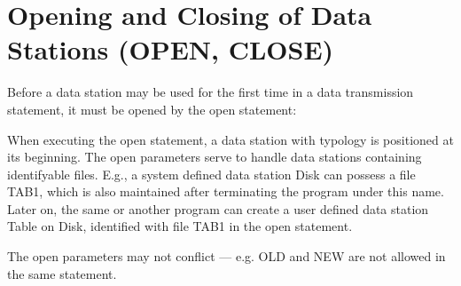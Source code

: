 \section{Opening and Closing of Data Stations (OPEN, CLOSE)}   %
\label{sec_open_close}

Before a data station may be used for the first time in a data
transmission statement, it must be opened by the open statement:



When executing the open statement, a data station with typology is
positioned at its beginning.
The open parameters serve to handle data stations containing
identifyable files. E.g., a system defined data station Disk can possess
a file TAB1, which is also maintained after terminating the program
under this name. Later on, the same or another program can create a user
defined data station Table on Disk, identified with file TAB1 in the
open statement.





The open parameters may not conflict --- e.g. OLD and NEW are not allowed
in the same statement.



